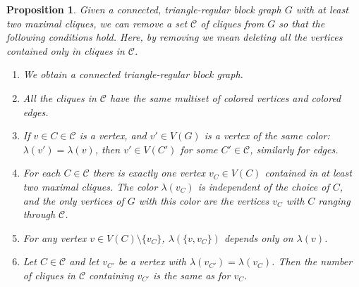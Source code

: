 \documentclass[a4paper, 11pt]{amsart}
\numberwithin{theorem}{section}
\newtheorem{proposition}[theorem]{Proposition}
\newcommand{\cC}{\mathcal{C}}
\begin{document}
\begin{proposition}\label{prop:removing-cliques}
    Given a connected, triangle-regular block graph $G$ with at least two maximal
    cliques, we can remove a set $\mathcal C$ of cliques from $G$ so that the
    following conditions hold. Here, by removing we mean deleting all
    the vertices contained {\em only} in cliques in $\mathcal{C}$. 
    \begin{enumerate}
        \item We obtain a connected triangle-regular block graph.
        \item All the cliques in $\mathcal{C}$ have the same multiset
	of colored vertices and colored edges.
        \item If $v\in C\in \mathcal{C}$ is a vertex, and $v' \in V(G)$ is a
	vertex of the same color: $\lambda(v')=\lambda(v)$, then $v'\in V(C')$ for some $C'\in \mathcal{C}$, similarly for edges.
        \item For each $C\in \mathcal{C}$ there is exactly one vertex
	$v_C\in V(C)$ contained in at least two maximal cliques. The
	color $\lambda(v_C)$  is independent of the choice of $C$, and
	the only vertices of $G$ with this color are the vertices
	$v_C$ with $C$ ranging through $\cC$.
        \item For any vertex $v\in V(C)\setminus \lbrace v_C\rbrace$,
	$\lambda(\{v,v_C\})$ depends only on $\lambda(v)$.
        \item Let $C\in \mathcal C$ and let $v_{C'}$ be a vertex with $\lambda(v_{C'}) = \lambda(v_C)$. Then the number of cliques in $\mathcal C$ containing $v_{C'}$ is the same as for $v_C$.
    \end{enumerate}
\end{proposition}
\end{document}
